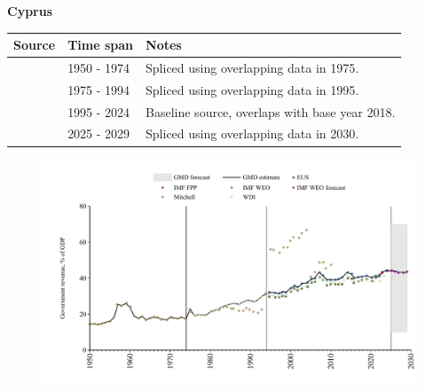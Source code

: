 \documentclass[12pt,a4paper,landscape]{article}
\begin{document}
\begin{adjustbox}{max totalsize={\paperwidth}{\paperheight},center}
\begin{minipage}[t][\textheight][t]{\textwidth}
\vspace*{0.5cm}
{}
\begin{center}
{\Large\bfseries Cyprus}
\end{center}
\vspace{0.5cm}
\begin{table}[H]
\centering
\small
\begin{tabular}{|l|l|l|}
\hline
\textbf{Source} & \textbf{Time span} & \textbf{Notes} \\
\hline
\rowcolor{white}\cite{Mitchell}& 1950 - 1974 &Spliced using overlapping data in 1975.\\
\rowcolor{lightgray}\cite{WDI}& 1975 - 1994 &Spliced using overlapping data in 1995.\\
\rowcolor{white}\cite{EUS}& 1995 - 2024 &Baseline source, overlaps with base year 2018.\\
\rowcolor{lightgray}\cite{IMF_WEO_forecast}& 2025 - 2029 &Spliced using overlapping data in 2030.\\
\hline
\end{tabular}
\end{table}
\begin{figure}[H]
\centering
\includegraphics[width=\textwidth,height=0.6\textheight,keepaspectratio]{graphs/CYP_govrev_GDP.pdf}
\end{figure}
\end{minipage}
\end{adjustbox}
\end{document}

